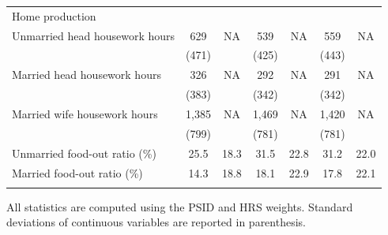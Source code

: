 \begin{center}
\begin{threeparttable}
\begin{tabular}{lcccccc}
Home production                             &       &         &       &         &       &         \\
\hspace{.3in} Unmarried head housework hours&629    &NA       &539    &NA       &559    &NA       \\
                                            &(471)  &         &(425)  &         &(443)  &         \\[1ex]
\hspace{.3in} Married head housework hours  &326    &NA       &292    &NA       &291    &NA       \\
                                            &(383)  &         &(342)  &         &(342)  &         \\[1ex]
\hspace{.3in} Married wife housework hours  &1,385  &NA       &1,469  &NA       &1,420  &NA       \\
                                            &(799)  &         &(781)  &         &(781)  &         \\[1ex]
\hspace{.3in} Unmarried food-out ratio (\%) &25.5   &18.3     &31.5   &22.8     &31.2   &22.0     \\[1ex]
\hspace{.3in} Married food-out ratio (\%)   &14.3   &18.8     &18.1   &22.9     &17.8   &22.1     \\[1ex]
\hline\hline \\[-1ex]
\end{tabular}
\begin{tablenotes}
\item[] \footnotesize{All statistics are computed using the PSID
and HRS weights. Standard deviations of continuous variables are
reported in parenthesis.}
\end{tablenotes}
\label{sum}
\end{threeparttable}
\end{center}

\clearpage

